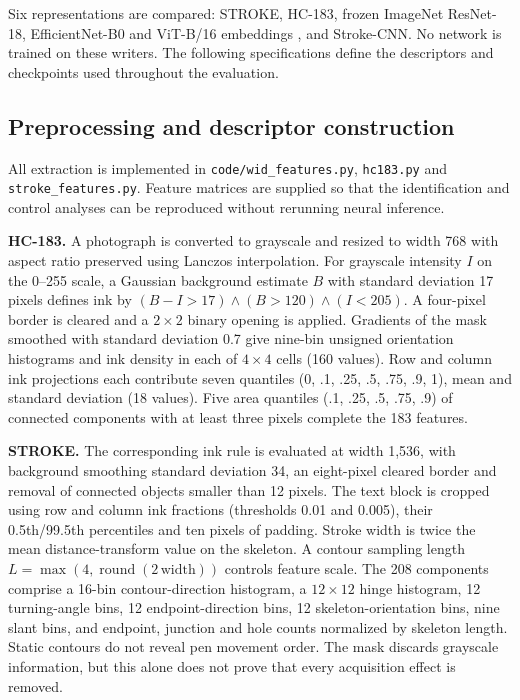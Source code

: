 Six representations are compared: STROKE, HC-183, frozen ImageNet ResNet-18, EfficientNet-B0 and ViT-B/16 embeddings \cite{he2016resnet,tan2019efficientnet,dosovitskiy2021vit}, and Stroke-CNN. No network is trained on these writers. The following specifications define the descriptors and checkpoints used throughout the evaluation.

\subsection{Preprocessing and descriptor construction}
All extraction is implemented in \texttt{code/wid\_features.py}, \texttt{hc183.py} and \texttt{stroke\_features.py}. Feature matrices are supplied so that the identification and control analyses can be reproduced without rerunning neural inference.

\textbf{HC-183.} A photograph is converted to grayscale and resized to width 768 with aspect ratio preserved using Lanczos interpolation. For grayscale intensity $I$ on the 0--255 scale, a Gaussian background estimate $B$ with standard deviation 17 pixels defines ink by $(B-I>17)\land(B>120)\land(I<205)$. A four-pixel border is cleared and a $2\times2$ binary opening is applied. Gradients of the mask smoothed with standard deviation 0.7 give nine-bin unsigned orientation histograms and ink density in each of $4\times4$ cells (160 values). Row and column ink projections each contribute seven quantiles (0, .1, .25, .5, .75, .9, 1), mean and standard deviation (18 values). Five area quantiles (.1, .25, .5, .75, .9) of connected components with at least three pixels complete the 183 features.

\textbf{STROKE.} The corresponding ink rule is evaluated at width 1,536, with background smoothing standard deviation 34, an eight-pixel cleared border and removal of connected objects smaller than 12 pixels. The text block is cropped using row and column ink fractions (thresholds 0.01 and 0.005), their 0.5th/99.5th percentiles and ten pixels of padding. Stroke width is twice the mean distance-transform value on the skeleton. A contour sampling length $L=\max(4,\operatorname{round}(2\,\mathrm{width}))$ controls feature scale. The 208 components comprise a 16-bin contour-direction histogram, a $12\times12$ hinge histogram, 12 turning-angle bins, 12 endpoint-direction bins, 12 skeleton-orientation bins, nine slant bins, and endpoint, junction and hole counts normalized by skeleton length. Static contours do not reveal pen movement order. The mask discards grayscale information, but this alone does not prove that every acquisition effect is removed.

